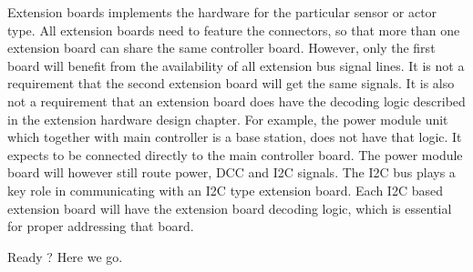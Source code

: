 Extension boards implements the hardware for the particular sensor or actor type. All extension boards need to feature the connectors, so that more than one extension board can share the same controller board. However, only the first board will benefit from the availability of all extension bus signal lines. It is not a requirement that the second extension board will get the same signals. It is also not a requirement that an extension board does have the decoding logic described in the extension hardware design chapter. For example, the power module unit which together with main controller is a base station, does not have that logic. It expects to be connected directly to the main controller board. The power module board will however still route power, DCC and I2C signals. The I2C bus plays a key role in communicating with an I2C type extension board. Each I2C based extension board will have the extension board decoding logic, which is essential for proper addressing that board.

Ready ? Here we go.